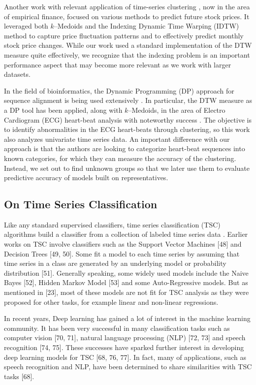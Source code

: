 Another work with relevant application of time-series clustering \cite{Nakagawa2019}, now in the area of empirical finance, focused on various methods to predict future stock prices. It leveraged both $k$--Medoids and the Indexing Dynamic Time Warping (IDTW) method to capture price fluctuation patterns and to effectively predict monthly stock price changes. While our work used a standard implementation of the DTW measure quite effectively, we recognize that the indexing problem is an important performance aspect that may become more relevant as we work with larger datasets.

In the field of bioinformatics, the Dynamic Programming (DP) approach for sequence alignment is being used extensively \cite{Dinov2016}. In particular, the DTW measure as a DP tool has been applied, along with $k$--Medoids, in the area of Electro Cardiogram (ECG) heart-beat analysis with noteworthy success \cite{Annam2011}. The objective is to identify abnormalities in the ECG heart-beats through clustering, so this work also analyzes univariate time series data. An important difference with our approach is that the authors are looking to categorize heart-beat sequences into known categories, for which they can measure the accuracy of the clustering. Instead, we set out to find unknown groups so that we later use them to evaluate predictive accuracy of models built on representatives.

\subsection{On Time Series Classification}

Like any standard supervised classifiers, time series classification (TSC) algorithms build a classifier from a collection of labeled time series data \cite{Bagnall2017a}. Earlier works on TSC involve classifiers such as the Support Vector Machines [48] and Decision Trees [49, 50]. Some fit a model to each time series by assuming that time series in a class are generated by an underlying model or probability distribution [51]. Generally speaking, some widely used models include the Naive Bayes [52], Hidden Markov Model [53] and some Auto-Regressive models. But as mentioned in [23], most of these models are not fit for TSC analysis as they were proposed for other tasks, for example linear and non-linear regressions. 

In recent years, Deep learning \cite{Charniak2019, Goodfellow2016} has gained a lot of interest in the machine learning community. It has been very successful in many classification tasks such as computer vision [70, 71], natural language processing (NLP) [72, 73] and speech recognition [74, 75]. These successes have sparked further interest in developing deep learning models for TSC [68, 76, 77]. In fact, many of applications, such as speech recognition and NLP, have been determined to share similarities with TSC tasks [68].

